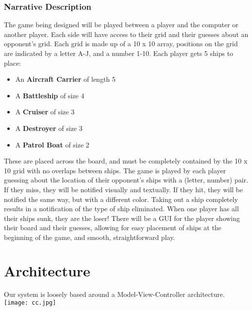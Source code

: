 \documentclass[10pt]{article}
\begin{document}
\section*{Narrative Description}
The game being designed will be played between a player and the computer or another player.
Each side will have access to their grid and their guesses about an opponent’s grid.
Each grid is made up of a 10 x 10 array, positions on the grid are indicated by a letter A-J, and a number 1-10.
Each player gets 5 ships to place:
\begin{itemize}
    \item An \textbf{Aircraft Carrier} of length 5
    \item A \textbf{Battleship} of size 4
    \item A \textbf{Cruiser} of size 3
    \item A \textbf{Destroyer} of size 3
    \item A \textbf{Patrol Boat} of size 2
\end{itemize}
These are placed across the board, and must be completely contained by the 10 x 10 grid with no overlaps between ships.
The game is played by each player guessing about the location of their opponent’s ships with a (letter, number) pair.
If they miss, they will be notified visually and textually.
If they hit, they will be notified the same way, but with a different color.
Taking out a ship completely results in a notification of the type of ship eliminated.
When one player has all their ships sunk, they are the loser!
There will be a GUI for the player showing their board and their guesses, allowing for easy placement of ships at the beginning of the game, and smooth, straightforward play. \\

\clearpage
\part*{Architecture}
Our system is loosely based around a Model-View-Controller architecture.\\
\texttt{[image: cc.jpg]}

\clearpage
\end{document}
